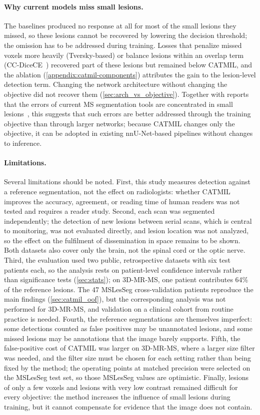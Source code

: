 \paragraph{Why current models miss small lesions.}
The baselines produced no response at all for most of the small lesions
they missed, so these lesions cannot be recovered by lowering the decision
threshold; the omission has to be addressed during training. Losses that
penalize missed voxels more heavily (Tversky-based) or balance lesions
within an overlap term (CC-DiceCE~\cite{bouteille_learning_2026}) recovered
part of these lesions but remained below CATMIL, and the ablation
(\cref{appendix:catmil-components}) attributes the gain to the lesion-level
detection term. Changing the network architecture without changing the
objective did not recover them (\cref{sec:arch_vs_objective}). Together
with reports that the errors of current MS segmentation tools are
concentrated in small lesions~\cite{dereskewicz_flames_2025}, this suggests
that such errors are better addressed through the training objective than
through larger networks; because CATMIL changes only the objective, it can
be adopted in existing nnU-Net-based pipelines without changes to
inference.

\paragraph{Limitations.}
Several limitations should be noted. First, this study measures detection
against a reference segmentation, not the effect on radiologists: whether
CATMIL improves the accuracy, agreement, or reading time of human readers
was not tested and requires a reader study. Second, each scan was segmented
independently; the detection of new lesions between serial scans, which is
central to monitoring, was not evaluated directly, and lesion location was
not analyzed, so the effect on the fulfilment of dissemination in space
remains to be shown. Both datasets also cover only the brain, not the
spinal cord or the optic nerve. Third, the evaluation used two public,
retrospective datasets with six test patients each, so the analysis rests
on patient-level confidence intervals rather than significance tests
(\cref{sec:stats}); on 3D-MR-MS, one patient contributes 64\% of the
reference lesions. The 47 MSLesSeg
cross-validation patients reproduce the main findings
(\cref{sec:catmil_oof}), but the corresponding analysis was not performed
for 3D-MR-MS, and validation on a clinical cohort from routine practice is
needed. Fourth, the reference segmentations are themselves imperfect: some
detections counted as false positives may be unannotated lesions, and some
missed lesions may be annotations that the image barely supports. Fifth,
the false-positive cost of CATMIL was larger on 3D-MR-MS, where a larger
size filter was needed, and the filter size must be chosen for each
setting rather than being fixed by the method; the operating points at
matched precision were selected on the MSLesSeg test set, so those
MSLesSeg values are optimistic. Finally, lesions of only a few voxels and
lesions with very low contrast remained difficult for every objective: the
method increases the influence of small lesions during training, but it
cannot compensate for evidence that the image does not contain.

